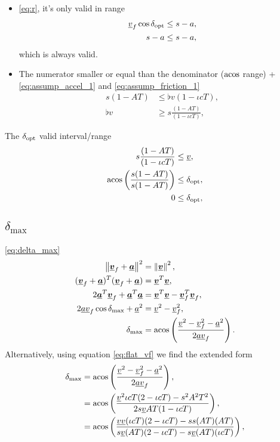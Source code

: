 \begin{itemize}
\item
\eqref{eq:r}, it's only valid in range
\begin{align*}
\flat{v}_f \cos\delta_{\opt} &\le s - a,\\
s - a&\le s - a,
\end{align*}
which is always valid.

\item
The numerator smaller or equal than the denominator ($\operatorname{acos}$ range) + \eqref{eq:assump_accel_1} and \eqref{eq:assump_friction_1}
\begin{align*}
s (1 - AT) &\le \flat{v}(1 - \iota cT),\\
\flat{v} &\ge s \frac{(1 - AT)}{(1 - \iota cT)},
\end{align*}
\end{itemize}

The $\delta_{\operatorname{opt}}$ valid interval/range
\begin{align*}
s \frac{(1 - AT)}{(1 - \iota cT)} &\le \flat{v},\\
\acos\left( \frac{s(1 - AT)}{s(1 - AT)} \right) &\le \delta_{\opt},\\
0 &\le \delta_{\opt},
\end{align*}


\subsection{\texorpdfstring{$\delta_{\max}$}{delta\_max}}
\eqref{eq:delta_max}
\begin{align*}
\norm{\vec{\flat{v}}_f + \vec{\flat{a}}}^2 &= \norm{\vec{\flat{v}}}^2,\\
(\vec{\flat{v}}_f + \vec{\flat{a}})^T (\vec{\flat{v}}_f + \vec{\flat{a}}) &= \vec{\flat{v}}^T \vec{\flat{v}},\\
2 \vec{\flat{a}}^T \vec{\flat{v}}_f + \vec{\flat{a}}^T \vec{\flat{a}} &= \vec{\flat{v}}^T \vec{\flat{v}} - \vec{\flat{v}}_f^T \vec{\flat{v}}_f,\\
2 \flat{a} \flat{v}_f \cos\delta_{\max} + \flat{a}^2 &= \flat{v}^2 - \flat{v}_f^2,\\
\delta_{\max} &= \acos\left( \frac{\flat{v}^2 - \flat{v}_f^2 - \flat{a}^2}{2 \flat{a} \flat{v}_f} \right).
\end{align*}
Alternatively, using equation \eqref{eq:flat_vf} we find the extended form
\begin{align*}
\delta_{\max} &= \acos\left( \frac{\flat{v}^2 - \flat{v}_f^2 - \flat{a}^2}{2 \flat{a} \flat{v}_f} \right),\\
&= \acos\left( \frac{\flat{v}^2 \iota cT(2 - \iota cT) - s^2 A^2 T^2}{2 s \flat{v} AT(1 - \iota cT)} \right),\\
&= \acos\left( \frac{\flat{v} \flat{v} (\iota cT)(2 - \iota cT) - ss (AT)(AT)}{s \flat{v} (AT)(2 - \iota cT) - s \flat{v} (AT)(\iota cT)} \right),
\end{align*}

